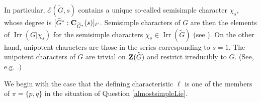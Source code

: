 \documentclass[12pt,leqno,a4paper]{amsart}
\newcommand{\Irr}{{\operatorname{Irr}}}
\def\zent#1{{\bf Z}(#1)}
\def\cent#1#2{{\bf C}_{#1}(#2)}
\theoremstyle{remark}
\newcommand\wt[1]{\widetilde{#1}}
\begin{document}
In particular, $\mathcal{E}(\wt{G}, s)$ contains a unique so-called semisimple character $\chi_s$, whose degree is $[\wt{G}^\ast:\cent{\wt{G}^\ast}{s}]_{\ell'}$. Semisimple characters of $G$ are then the elements of $\Irr(G|\chi_s)$ for the semisimple characters $\chi_s\in\Irr(\wt{G})$  (see \cite[Corollary 2.6.18]{GM20}).
On the other hand, unipotent characters are those in the series corresponding to $s=1$.  The unipotent characters of $\wt{G}$ are trivial on $\zent{\wt{G}}$ and restrict irreducibly to $G$. (See, e.g. \cite[2.3.16 and 4.2.1]{GM20}.)


 
We begin with the case that the defining characteristic $\ell$ is one of the members of $\pi=\{p,q\}$ in the situation of Question \ref{almostsimpleLie}.
\end{document}
